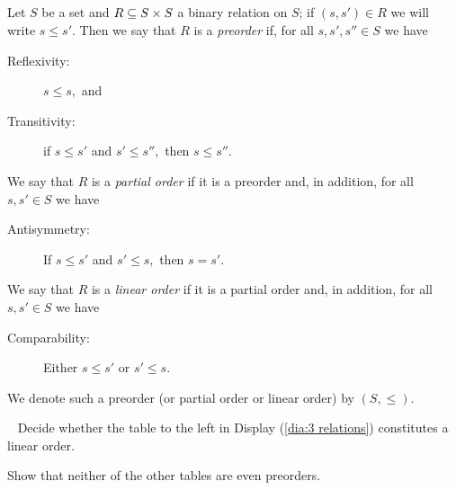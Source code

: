 \documentclass[../main/CT4S-EN-RU]{subfiles}
\begin{document}

\subsection{}

\begin{definitionENG}\label{def:orders}
Let $S$ be a set and $R\ss S\times S$ a binary relation on $S$; if $(s,s')\in R$ we will write $s\leq s'.$ Then we say that $R$ is a {\em preorder} if, for all $s,s',s''\in S$ we have
\begin{description}
\item[Reflexivity:] $s\leq s,$ and
\item[Transitivity:] if $s\leq s'$ and $s'\leq s'',$ then $s\leq s''.$
\end{description}
We say that $R$ is a {\em partial order} if it is a preorder and, in addition, for all $s,s'\in S$ we have
\begin{description}
\item[Antisymmetry:] If $s\leq s'$ and $s'\leq s,$ then $s=s'.$
\end{description}
We say that $R$ is a {\em linear order} if it is a partial order and, in addition, for all $s,s'\in S$ we have
\begin{description}
\item[Comparability:] Either $s\leq s'$ or $s'\leq s.$
\end{description}
We denote such a preorder (or partial order or linear order) by $(S,\leq).$
\end{definitionENG}

\begin{definitionRUS}\label{def:orders}
\end{definitionRUS}

\begin{exerciseENG}~
\sexc Decide whether the table to the left in Display (\ref{dia:3 relations}) constitutes a linear order. 
\item Show that neither of the other tables are even preorders.
\endsexc
\end{exerciseENG}

\begin{exerciseRUS}~
\end{exerciseRUS}
\end{document}
